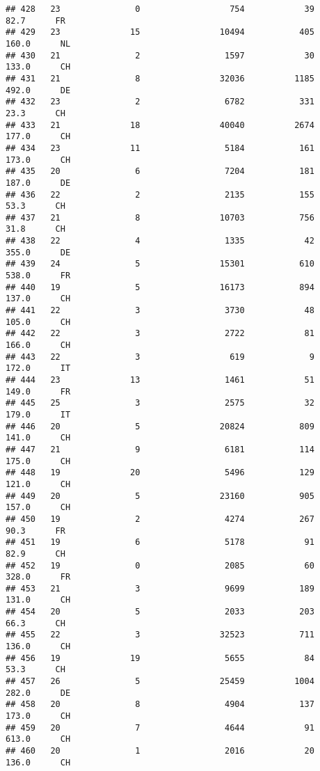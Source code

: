 \documentclass[
]{article}
\begin{document}
\begin{verbatim}
## 428   23               0                  754            39     82.7      FR
## 429   23              15                10494           405    160.0      NL
## 430   21               2                 1597            30    133.0      CH
## 431   21               8                32036          1185    492.0      DE
## 432   23               2                 6782           331     23.3      CH
## 433   21              18                40040          2674    177.0      CH
## 434   23              11                 5184           161    173.0      CH
## 435   20               6                 7204           181    187.0      DE
## 436   22               2                 2135           155     53.3      CH
## 437   21               8                10703           756     31.8      CH
## 438   22               4                 1335            42    355.0      DE
## 439   24               5                15301           610    538.0      FR
## 440   19               5                16173           894    137.0      CH
## 441   22               3                 3730            48    105.0      CH
## 442   22               3                 2722            81    166.0      CH
## 443   22               3                  619             9    172.0      IT
## 444   23              13                 1461            51    149.0      FR
## 445   25               3                 2575            32    179.0      IT
## 446   20               5                20824           809    141.0      CH
## 447   21               9                 6181           114    175.0      CH
## 448   19              20                 5496           129    121.0      CH
## 449   20               5                23160           905    157.0      CH
## 450   19               2                 4274           267     90.3      FR
## 451   19               6                 5178            91     82.9      CH
## 452   19               0                 2085            60    328.0      FR
## 453   21               3                 9699           189    131.0      CH
## 454   20               5                 2033           203     66.3      CH
## 455   22               3                32523           711    136.0      CH
## 456   19              19                 5655            84     53.3      CH
## 457   26               5                25459          1004    282.0      DE
## 458   20               8                 4904           137    173.0      CH
## 459   20               7                 4644            91    613.0      CH
## 460   20               1                 2016            20    136.0      CH

\end{verbatim}
\end{document}
